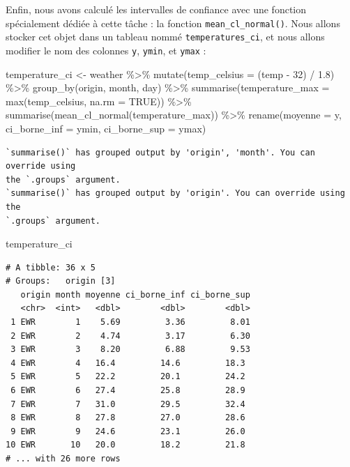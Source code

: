 \documentclass[
  a4paper,
  DIV=11,
  numbers=noendperiod,
  oneside]{scrreprt}
\newenvironment{Shaded}{}{}
\newcommand{\AttributeTok}[1]{\textcolor[rgb]{0.84,0.23,0.29}{#1}}
\newcommand{\ConstantTok}[1]{\textcolor[rgb]{0.00,0.36,0.77}{#1}}
\newcommand{\DecValTok}[1]{\textcolor[rgb]{0.00,0.36,0.77}{#1}}
\newcommand{\FloatTok}[1]{\textcolor[rgb]{0.00,0.36,0.77}{#1}}
\newcommand{\FunctionTok}[1]{\textcolor[rgb]{0.44,0.26,0.76}{#1}}
\newcommand{\NormalTok}[1]{\textcolor[rgb]{0.14,0.16,0.18}{#1}}
\newcommand{\OtherTok}[1]{\textcolor[rgb]{0.44,0.26,0.76}{#1}}
\newcommand{\SpecialCharTok}[1]{\textcolor[rgb]{0.00,0.36,0.77}{#1}}
\begin{document}
Enfin, nous avons calculé les intervalles de confiance avec une fonction
spécialement dédiée à cette tâche : la fonction
\texttt{mean\_cl\_normal()}. Nous allons stocker cet objet dans un
tableau nommé \texttt{temperatures\_ci}, et nous allons modifier le nom
des colonnes \texttt{y}, \texttt{ymin}, et \texttt{ymax} :

\begin{Shaded}
\begin{Highlighting}[]
\NormalTok{temperature\_ci }\OtherTok{\textless{}{-}}\NormalTok{ weather }\SpecialCharTok{\%\textgreater{}\%} 
  \FunctionTok{mutate}\NormalTok{(}\AttributeTok{temp\_celsius =}\NormalTok{ (temp }\SpecialCharTok{{-}} \DecValTok{32}\NormalTok{) }\SpecialCharTok{/} \FloatTok{1.8}\NormalTok{) }\SpecialCharTok{\%\textgreater{}\%} 
  \FunctionTok{group\_by}\NormalTok{(origin, month, day) }\SpecialCharTok{\%\textgreater{}\%} 
  \FunctionTok{summarise}\NormalTok{(}\AttributeTok{temperature\_max =} \FunctionTok{max}\NormalTok{(temp\_celsius, }\AttributeTok{na.rm =} \ConstantTok{TRUE}\NormalTok{)) }\SpecialCharTok{\%\textgreater{}\%} 
  \FunctionTok{summarise}\NormalTok{(}\FunctionTok{mean\_cl\_normal}\NormalTok{(temperature\_max)) }\SpecialCharTok{\%\textgreater{}\%} 
  \FunctionTok{rename}\NormalTok{(}\AttributeTok{moyenne =}\NormalTok{ y,}
         \AttributeTok{ci\_borne\_inf =}\NormalTok{ ymin,}
         \AttributeTok{ci\_borne\_sup =}\NormalTok{ ymax)}
\end{Highlighting}
\end{Shaded}

\begin{verbatim}
`summarise()` has grouped output by 'origin', 'month'. You can override using
the `.groups` argument.
`summarise()` has grouped output by 'origin'. You can override using the
`.groups` argument.
\end{verbatim}

\begin{Shaded}
\begin{Highlighting}[]
\NormalTok{temperature\_ci}
\end{Highlighting}
\end{Shaded}

\begin{verbatim}
# A tibble: 36 x 5
# Groups:   origin [3]
   origin month moyenne ci_borne_inf ci_borne_sup
   <chr>  <int>   <dbl>        <dbl>        <dbl>
 1 EWR        1    5.69         3.36         8.01
 2 EWR        2    4.74         3.17         6.30
 3 EWR        3    8.20         6.88         9.53
 4 EWR        4   16.4         14.6         18.3 
 5 EWR        5   22.2         20.1         24.2 
 6 EWR        6   27.4         25.8         28.9 
 7 EWR        7   31.0         29.5         32.4 
 8 EWR        8   27.8         27.0         28.6 
 9 EWR        9   24.6         23.1         26.0 
10 EWR       10   20.0         18.2         21.8 
# ... with 26 more rows
\end{verbatim}
\end{document}
